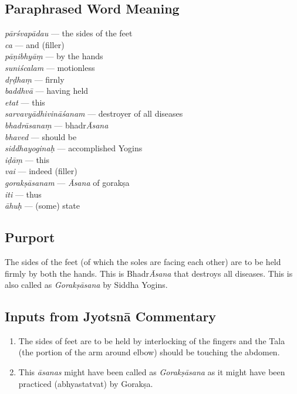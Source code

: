 \subsection*{Paraphrased Word Meaning}
\vspace{-10pt}

\begin{multicols}{2}
\textit{pārśvapādau} ---  the sides of the feet  \\
\textit{ca} ---  and (filler) \\
\textit{pāṇibhyāṃ} ---  by the hands  \\
\textit{suniścalam} --- motionless  \\
\textit{dṛḍhaṃ} ---  firnly \\
\textit{baddhvā} --- having held  \\
\textit{etat} ---  this  \\
\textit{sarvavyādhivināśanam} --- destroyer of all diseases  \\
\textit{bhadrāsanaṃ} --- bhadr\textit{Āsana} \\
\textit{bhaved} --- should be \\
\textit{siddhayoginaḥ} ---  accomplished Yogins \\
\textit{iḍāṃ} ---  this  \\
\textit{vai} ---  indeed (filler) \\
\textit{gorakṣāsanam} ---  \textit{Āsana} of gorakṣa \\
\textit{iti} --- thus  \\
\textit{āhuḥ}  --- (some) state
\end{multicols}
\vspace{-10pt}

\subsection*{Purport}
\vspace{-10pt}

The sides of the feet (of which the soles are facing each other) are to be held firmly by both the hands. This is Bhadr\textit{Āsana} that destroys all diseases. This is also called as \textit{Gorakṣāsana} by Siddha Yogins.
\vspace{-10pt}

\subsection*{Inputs from Jyotsnā Commentary}
\vspace{-10pt}

\begin{enumerate}
\itemsep=0pt
\item The sides of feet are to be held by interlocking of the fingers and the Tala (the portion of the arm around elbow) should be touching the abdomen. 
\item This \textit{āsanas} might have been called as \textit{Gorakṣāsana} as it might have been practiced (abhyastatvat) by Gorakṣa. 
\end{enumerate}
